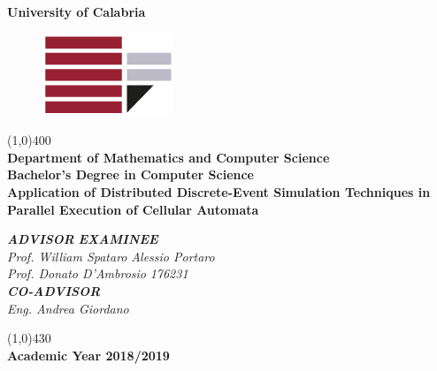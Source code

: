 \documentclass[12pt,a4paper,fleqn]{report}
\begin{document}
\begin{titlepage}
\begin{center}
\huge{\textbf{University of Calabria}}\\
\begin{figure}[bt]
\centering
\includegraphics[scale=0.5]{Stemma}\\
\end{figure}
\line(1,0){400}\\[5mm]
\Large{\textbf{Department of Mathematics and Computer Science}}\\
\Large{\textbf{Bachelor's Degree in Computer Science}}\\
\vspace{35mm}
\Huge{\textbf{Application of Distributed Discrete-Event Simulation Techniques in Parallel Execution of Cellular Automata}}
\end{center}
\vspace{35mm}
\begin{flushleft}
\large{\textsc{\textit{\textbf{ADVISOR}}}}
\hfill \large{\textit{\textsc{\textbf{EXAMINEE}}}}\\
\Large{\textit{Prof. William Spataro}}
\hfill \Large{\textit{Alessio Portaro}}\\
\Large{\textit{Prof. Donato D'Ambrosio}}
\hfill \Large{\textit{176231}}\\
\large{\textsc{\textit{\textbf{CO-ADVISOR}}}}\\
\Large{\textit{Eng. Andrea Giordano}}
\end{flushleft}
\vfill
\begin{center}
\line(1,0){430}\\[5mm]
{\large{\bf Academic Year 2018/2019}}\\
\end{center}
\end{titlepage}
\newpage
\thispagestyle{empty}
\tableofcontents
\thispagestyle{empty}

\newpage
\setcounter{page}{1}
\end{document}
